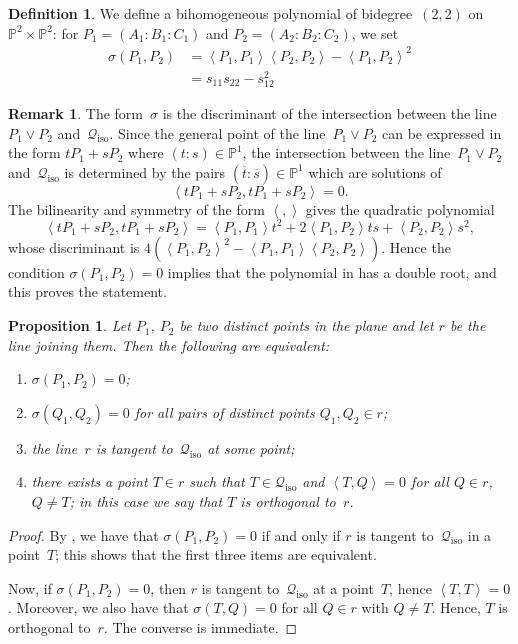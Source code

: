 \documentclass[a4paper, 11pt, reqno]{amsart}
\theoremstyle{plain}
\newtheorem{prop}[lemma]{Proposition}
\theoremstyle{definition}
\newtheorem{definition}[lemma]{Definition}
\newtheorem{rmk}[lemma]{Remark}
\newcommand{\p}{\mathbb{P}}
\newcommand{\iso}{\mathcal{Q}_{\mathrm{iso}}}
\newcommand{\scl}[2]{\left\langle {#1}, {#2} \right\rangle}
\begin{document}
\begin{definition}
\label{definition:sigma}
We define a bihomogeneous polynomial of bidegree~$(2,2)$ on $\p^2 \times \p^2$: for $P_1 = (A_1: B_1: C_1)$ and $P_2 = (A_2: B_2: C_2)$, we set
%
\begin{equation}
\label{formula:sigma}
\begin{aligned}
  \sigma(P_1, P_2) &= \scl{P_1}{P_1} \scl{P_2}{P_2} - \scl{P_1}{P_2}^2 \\
   &= s_{11}s_{22}-s_{12}^2
\end{aligned}
\end{equation}
%
\end{definition}

\begin{rmk}
\label{rmk:sigma_discr}
The form~$\sigma$ is the discriminant of the intersection between the line~$P_1 \vee P_2$ and~$\iso$.
Since the general point of the line~$P_1 \vee P_2$ can be expressed in the form
$t P_1 + sP_2$ where $(t:s) \in \p^1$, the intersection between the line~$P_1 \vee P_2$
and~$\iso$ is determined by the pairs $(\overline{t}: \overline{s}) \in \p^1$ which are solutions of
%
\[
  \scl{t P_1 + sP_2}{t P_1 + sP_2} =0.
\]
%
The bilinearity and symmetry of the form $\scl{}{}$ gives the quadratic polynomial
%
\begin{equation}
\label{eq:intersection_isotropic}
  \scl{t P_1 + sP_2}{t P_1 + sP_2} =
  \scl{P_1}{P_1} t^2 + 2\scl{P_1}{P_2} ts + \scl{P_2}{P_2}s^2,
\end{equation}
%
whose discriminant is $4 ( \scl{P_1}{P_2}^2 - \scl{P_1}{P_1} \scl{P_2}{P_2})$.
Hence the condition $\sigma(P_1, P_2)=0$ implies that the polynomial in 
has a double root, and this proves the statement.
\end{rmk}

\begin{prop}
\label{proposition:sigma_tangency}
Let $P_1$, $P_2$ be two distinct points in the plane and let $r$ be the line joining them.
Then the following are equivalent:
%
\begin{enumerate}
  \item $\sigma(P_1, P_2) = 0$;
  \item $\sigma(Q_1, Q_2) = 0$ for all pairs of distinct points $Q_1, Q_2 \in r$;
  \item the line~$r$ is tangent to~$\iso$ at some point;
  \item there exists a point $T \in r$ such that $T \in \iso$ and $\scl{T}{Q} = 0$ for all $Q \in r$, $Q \neq T$; in this case we say that $T$ is \emph{orthogonal} to~$r$.
\end{enumerate}
%
\end{prop}
\begin{proof}
By , we have that $\sigma(P_1, P_2) = 0$ if and only if $r$ is tangent to~$\iso$ in a point~$T$; this shows that the first three items are equivalent.

Now, if $\sigma(P_1, P_2) = 0$, then $r$ is tangent to~$\iso$ at a point~$T$, hence $\scl{T}{T} = 0$.
Moreover, we also have that $\sigma(T, Q) = 0$ for all $Q \in r$ with $Q \neq T$.
Hence, $T$ is orthogonal to~$r$.
The converse is immediate.
\end{proof}
\end{document}

